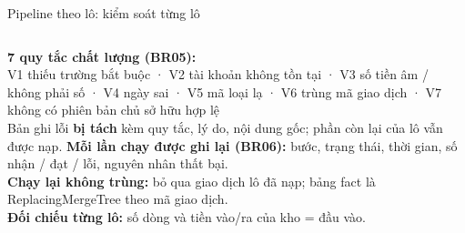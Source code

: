 \documentclass[aspectratio=169,11pt]{beamer}
\begin{document}
\begin{frame}{Pipeline theo lô: kiểm soát từng lô}
  \centering
  \medskip

  \begin{columns}[T]
    \footnotesize
    \textbf{7 quy tắc chất lượng (BR05):}\\
    V1 thiếu trường bắt buộc · V2 tài khoản không tồn tại · V3 số tiền âm / không phải số · V4 ngày sai · V5 mã loại lạ · V6 trùng mã giao dịch · V7 không có phiên bản chủ sở hữu hợp lệ\\[4pt]
    Bản ghi lỗi \textbf{bị tách} kèm quy tắc, lý do, nội dung gốc; phần còn lại của lô vẫn được nạp.
    \footnotesize
    \textbf{Mỗi lần chạy được ghi lại (BR06):} bước, trạng thái, thời gian, số nhận / đạt / lỗi, nguyên nhân thất bại.\\[4pt]
    \textbf{Chạy lại không trùng:} bỏ qua giao dịch lô đã nạp; bảng fact là ReplacingMergeTree theo mã giao dịch.\\[4pt]
    \textbf{Đối chiếu từng lô:} số dòng và tiền vào/ra của kho = đầu vào.
  \end{columns}
\end{frame}
\end{document}
